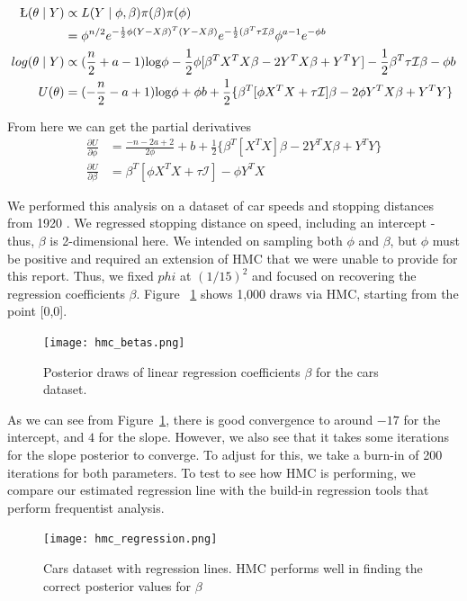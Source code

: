 \documentclass{article}
\numberwithin{equation}{section}
\begin{document}
\begin{align*}
\L(\theta\mid Y) &\propto L(Y\mid \phi,\beta)\pi(\beta)\pi(\phi)\\
&= \phi^{n/2}e^{-\frac{1}{2}\phi(Y-X\beta)^T(Y-X\beta)}e^{-\frac{1}{2}(\beta^T\tau\mathcal{I}\beta}\phi^{a-1}e^{-\phi b}\\
log(\theta\mid Y) &\propto (\frac{n}{2} + a - 1)\text{log}\phi - \frac{1}{2}\phi[\beta^TX^TX\beta - 2Y^TX\beta + Y^TY] - \frac{1}{2}\beta^T\tau\mathcal{I}\beta - \phi b\\
U(\theta) &= (-\frac{n}{2} - a + 1)\text{log}\phi + \phi b + \frac{1}{2}\{\beta^T[\phi X^TX + \tau\mathcal{I}]\beta - 2\phi Y^TX\beta + Y^TY\}
\end{align*}

From here we can get the partial derivatives
\begin{align*}
\frac{\partial U}{\partial \phi} &= \frac{-n - 2a + 2}{2\phi} + b + \frac{1}{2}\{\beta^T[X^TX]\beta - 2Y^TX\beta + Y^TY\}\\
\frac{\partial U}{\partial \beta} &= \beta^T[\phi X^TX + \tau\mathcal{I}] - \phi Y^TX
\end{align*}

We performed this analysis on a dataset of car speeds and stopping distances from 1920 \cite{cars}. We regressed stopping distance on speed, including an intercept - thus, $\beta$ is 2-dimensional here. We intended on sampling both $\phi$ and $\beta$, but $\phi$ must be positive and required an extension of HMC that we were unable to provide for this report. Thus, we fixed $phi$ at $(1/15)^2$ and focused on recovering the regression coefficients $\beta$. Figure ~\ref{betas} shows 1,000 draws via HMC, starting from the point [0,0].

\begin{figure}[H]
\centering
  \texttt{[image: hmc\_betas.png]}
  \caption{Posterior draws of linear regression coefficients $\beta$ for the cars dataset.}
\label{betas}
\end{figure}

As we can see from Figure~\ref{betas}, there is good convergence to around $-17$ for the intercept, and $4$ for the slope. However, we also see that it takes some iterations for the slope posterior to converge. To adjust for this, we take a burn-in of 200 iterations for both parameters. To test to see how HMC is performing, we compare our estimated regression line with the build-in regression tools that perform frequentist analysis.

\begin{figure}[H]
\centering
  \texttt{[image: hmc\_regression.png]}
  \caption{Cars dataset with regression lines.  HMC performs well in finding the correct posterior values for $\beta$}
\label{regress}
\end{figure}
\end{document}
